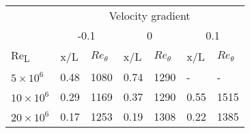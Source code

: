 


\begin{table}[]
\begin{tabular}{l|l|l|l|l|l|l|}
\cline{2-7}
                           & \multicolumn{6}{c|}{Velocity gradient}                                        \\ \cline{2-7} 
                           & \multicolumn{2}{c|}{-0.1} & \multicolumn{2}{c|}{0} & \multicolumn{2}{c|}{0.1} \\ \hline
\multicolumn{1}{|l|}{Re\textsubscript{L}}  & x/L          & $Re_\theta$       & x/L        & $Re_\theta$      & x/L         & $Re_\theta$      \\ \hline
\multicolumn{1}{|l|}{$5\times 10^6$}  & 0.48       & 1080         & 0.74     & 1290        & -         & -            \\ \hline
\multicolumn{1}{|l|}{$10\times 10^6$} & 0.29       & 1169         & 0.37     & 1290        & 0.55      & 1515         \\ \hline
\multicolumn{1}{|l|}{$20\times 10^6$} & 0.17       & 1253         & 0.19     & 1308        & 0.22      & 1385         \\ \hline
\end{tabular}
\end{table}